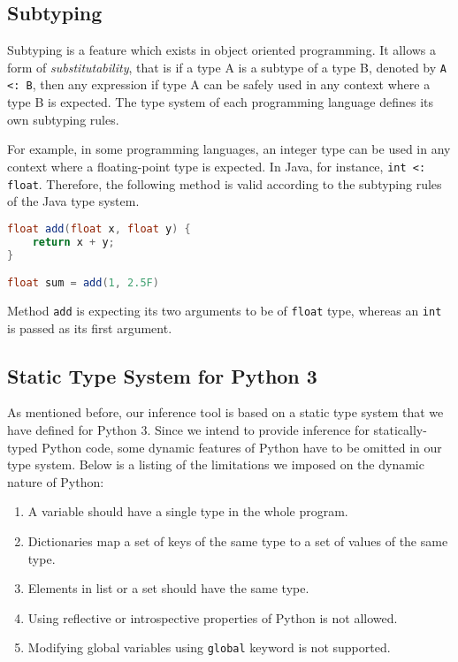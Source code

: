 \subsection{Subtyping}
Subtyping is a feature which exists in object oriented programming. It allows a form of \textit{substitutability}, that is if a type A is a subtype of a type B, denoted by \lstinline|A <: B|, then any expression if type A can be safely used in any context where a type B is expected. The type system of each programming language defines its own subtyping rules.

For example, in some programming languages, an integer type can be used in any context where a floating-point type is expected. In Java, for instance, \lstinline|int <: float|. Therefore, the following method is valid according to the subtyping rules of the Java type system.

\begin{lstlisting}[language=java]
float add(float x, float y) {
	return x + y;
}

float sum = add(1, 2.5F)
\end{lstlisting}

Method \lstinline|add| is expecting its two arguments to be of \lstinline|float| type, whereas an \lstinline|int| is passed as its first argument.


\subsection{Static Type System for Python 3}
As mentioned before, our inference tool is based on a static type system that we have defined for Python 3. Since we intend to provide inference for statically-typed Python code, some dynamic features of Python have to be omitted in our type system. Below is a listing of the limitations we imposed on the dynamic nature of Python:
\begin{enumerate}
	\item A variable should have a single type in the whole program.
	\item Dictionaries map a set of keys of the same type to a set of values of the same type.
	\item Elements in list or a set should have the same type.
	\item Using reflective or introspective properties of Python is not allowed.
	\item Modifying global variables using \lstinline|global| keyword is not supported.
\end{enumerate}

